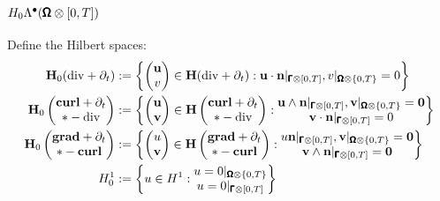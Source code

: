         \subsection*{$H_{0}\Lambda^{\bullet}(\pmb{\mathsf{\Omega}}\otimes[0, T])$}
            Define the Hilbert spaces:
            \begin{align}
                \mathbf{H}_{0}(\mathrm{div} + \partial_{t})  &:=  \left\{\begin{pmatrix} \mathbf{u} \\ v \end{pmatrix} \in \mathbf{H}(\mathrm{div} + \partial_{t}) : \mathbf{u}\cdot\mathbf{n}|_{\pmb{\mathsf{\Gamma}}\otimes[0, T]}, v|_{\pmb{\mathsf{\Omega}}\otimes\{0, T\}} = 0\right\}  \\
                \mathbf{H}_{0}\left(\begin{matrix} \mathbf{curl} + \partial_{t} \\ * - \mathrm{div} \end{matrix}\right)  &:=  \left\{\begin{pmatrix} \mathbf{u} \\ \mathbf{v} \end{pmatrix} \in \mathbf{H}\left(\begin{matrix} \mathbf{curl} + \partial_{t} \\ * - \mathrm{div} \end{matrix}\right) : \begin{matrix} \mathbf{u}\wedge\mathbf{n}|_{\pmb{\mathsf{\Gamma}}\otimes[0, T]}, \mathbf{v}|_{\pmb{\mathsf{\Omega}}\otimes\{0, T\}} = \mathbf{0} \\ \mathbf{v}\cdot\mathbf{n}|_{\pmb{\mathsf{\Gamma}}\otimes[0, T]} = 0 \end{matrix}\right\}  \\
                \mathbf{H}_{0}\left(\begin{matrix} \mathbf{grad} + \partial_{t} \\ * - \mathbf{curl} \end{matrix}\right)  &:=  \left\{\begin{pmatrix} u \\ \mathbf{v} \end{pmatrix} \in \mathbf{H}\left(\begin{matrix} \mathbf{grad} + \partial_{t} \\ * - \mathbf{curl} \end{matrix}\right) : \begin{matrix} u\mathbf{n}|_{\pmb{\mathsf{\Gamma}}\otimes[0, T]}, \mathbf{v}|_{\pmb{\mathsf{\Omega}}\otimes\{0, T\}} = \mathbf{0} \\ \mathbf{v}\wedge\mathbf{n}|_{\pmb{\mathsf{\Gamma}}\otimes[0, T]} = \mathbf{0} \end{matrix}\right\}  \\
                H^{1}_{0}  &:=  \left\{u \in H^{1} : \begin{matrix} u = 0|_{\pmb{\mathsf{\Omega}}\otimes\{0, T\}} \\ u = 0|_{\pmb{\mathsf{\Gamma}}\otimes[0, T]} \end{matrix}\right\}
            \end{align}

